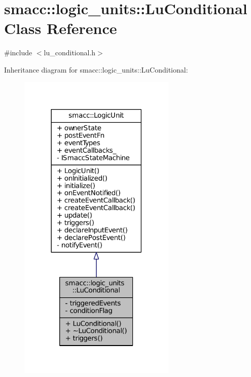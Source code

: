 \hypertarget{classsmacc_1_1logic__units_1_1LuConditional}{}\section{smacc\+:\+:logic\+\_\+units\+:\+:Lu\+Conditional Class Reference}
\label{classsmacc_1_1logic__units_1_1LuConditional}


{\ttfamily \#include $<$lu\+\_\+conditional.\+h$>$}



Inheritance diagram for smacc\+:\+:logic\+\_\+units\+:\+:Lu\+Conditional\+:
\nopagebreak
\begin{figure}[H]
\begin{center}
\leavevmode
\includegraphics[width=213pt]{classsmacc_1_1logic__units_1_1LuConditional__inherit__graph}
\end{center}
\end{figure}


